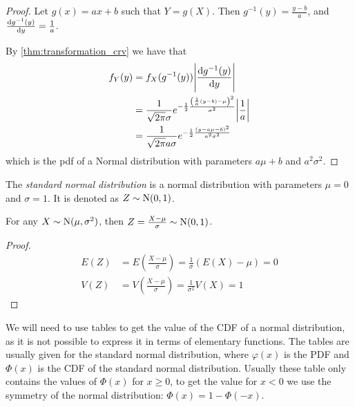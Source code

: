 \documentclass[12pt]{extarticle}
\newcommand{\Normal}{{\operatorfont N}}
\begin{document}
\begin{proof}
    Let $g(x) = ax + b$ such that $Y = g(X)$.
    Then $g^{-1}(y) = \frac{y - b}{a}$, and $\dv{g^{-1}(y)}{y} = \frac{1}{a}$.

    By \autoref{thm:transformation_crv} we have that
    \begin{align}
        f_Y(y) & = f_X(g^{-1}(y)) \abs{\dv{g^{-1}(y)}{y}}                                                                                \\
               & = \frac{1}{\sqrt{2\pi} \sigma} e^{-\frac{1}{2} \frac{\left(\frac{1}{a}(y-b)- \mu\right)^2}{\sigma^2}} \abs{\frac{1}{a}} \\
               & = \frac{1}{\sqrt{2\pi} a \sigma} e^{-\frac{1}{2} \frac{(y - a\mu - b)^2}{a^2 \sigma^2}}
    \end{align}
    which is the pdf of a Normal distribution with parameters $a\mu + b$ and $a^2 \sigma^2$.
\end{proof}

\begin{definition}
    The \emph{standard normal distribution} is a normal distribution with parameters $\mu = 0$ and $\sigma = 1$. It is denoted as $Z \sim \Normal(0, 1)$.
\end{definition}

\begin{lemma}
    For any $X \sim \Normal(\mu, \sigma^2)$, then $Z = \frac{X - \mu}{\sigma} \sim \Normal(0, 1)$.
\end{lemma}

\begin{proof}
    \begin{align}
        E(Z) & = E\left(\frac{X - \mu}{\sigma}\right) = \frac{1}{\sigma} (E(X) - \mu) = 0 \\
        V(Z) & = V\left(\frac{X - \mu}{\sigma}\right) = \frac{1}{\sigma^2} V(X) = 1
    \end{align}
\end{proof}

\begin{remark}
    We will need to use tables to get the value of the CDF of a normal distribution, as it is not possible to express it in terms of elementary functions.
    The tables are usually given for the standard normal distribution, where $\varphi(x)$ is the PDF and $\Phi(x)$ is the CDF of the standard normal distribution.
    Usually these table only contains the values of $\Phi(x)$ for $x \geq 0$, to get the value for $x < 0$ we use the symmetry of the normal distribution: $\Phi(x) = 1 - \Phi(-x)$.
\end{remark}
\end{document}
